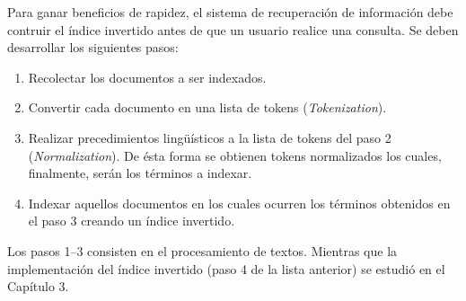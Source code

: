 		Para ganar beneficios de rapidez, el sistema de recuperación de información debe contruir el índice invertido antes de que un usuario realice una consulta. Se deben desarrollar los siguientes pasos:
		\begin{enumerate}
			\item Recolectar los documentos a ser indexados.
			\item Convertir cada documento en una lista de tokens (\textit{Tokenization}).
			\item Realizar precedimientos lingüísticos a la lista de tokens del paso 2 (\textit{Normalization}). De ésta forma se obtienen tokens normalizados los cuales, finalmente, serán los términos a indexar.
			\item Indexar aquellos documentos en los cuales ocurren los términos obtenidos en el paso 3 creando un índice invertido.
		\end{enumerate}
		Los pasos 1--3 consisten en el procesamiento de textos. Mientras que la implementación del índice invertido (paso 4 de la lista anterior) se estudió en el Capítulo 3.
		
		
